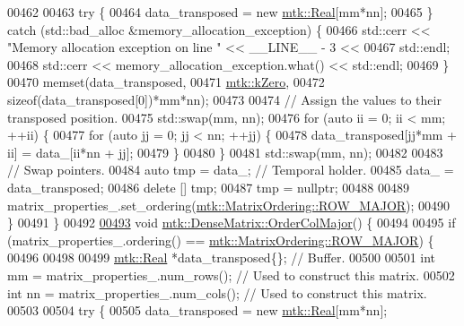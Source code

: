 \begin{DoxyCode}
00462 
00463     \textcolor{keywordflow}{try} \{
00464       data\_transposed = \textcolor{keyword}{new} \hyperlink{group__c01-roots_gac080bbbf5cbb5502c9f00405f894857d}{mtk::Real}[mm*nn];
00465     \} \textcolor{keywordflow}{catch} (std::bad\_alloc &memory\_allocation\_exception) \{
00466       std::cerr << \textcolor{stringliteral}{"Memory allocation exception on line "} << \_\_LINE\_\_ - 3 <<
00467         std::endl;
00468       std::cerr << memory\_allocation\_exception.what() << std::endl;
00469     \}
00470     memset(data\_transposed,
00471           \hyperlink{group__c01-roots_ga59a451a5fae30d59649bcda274fea271}{mtk::kZero},
00472           \textcolor{keyword}{sizeof}(data\_transposed[0])*mm*nn);
00473 
00474     \textcolor{comment}{// Assign the values to their transposed position.}
00475     std::swap(mm, nn);
00476     \textcolor{keywordflow}{for} (\textcolor{keyword}{auto} ii = 0; ii < mm; ++ii) \{
00477       \textcolor{keywordflow}{for} (\textcolor{keyword}{auto} jj = 0; jj < nn; ++jj) \{
00478         data\_transposed[jj*mm + ii] = data\_[ii*nn + jj];
00479       \}
00480     \}
00481     std::swap(mm, nn);
00482 
00483     \textcolor{comment}{// Swap pointers.}
00484     \textcolor{keyword}{auto} tmp = data\_; \textcolor{comment}{// Temporal holder.}
00485     data\_ = data\_transposed;
00486     \textcolor{keyword}{delete} [] tmp;
00487     tmp = \textcolor{keyword}{nullptr};
00488 
00489     matrix\_properties\_.set\_ordering(\hyperlink{namespacemtk_ga622801bd9f912d0f976c3e383f5f581ca21541962976d7709c26e9cd8385bd648}{mtk::MatrixOrdering::ROW\_MAJOR});
00490   \}
00491 \}
00492 
\hypertarget{mtk__dense__matrix_8cc_source_l00493}{}\hyperlink{classmtk_1_1DenseMatrix_a59b9bea24acf39dca64e8549b3527463}{00493} \textcolor{keywordtype}{void} \hyperlink{classmtk_1_1DenseMatrix_a59b9bea24acf39dca64e8549b3527463}{mtk::DenseMatrix::OrderColMajor}() \{
00494 
00495   \textcolor{keywordflow}{if} (matrix\_properties\_.ordering() == \hyperlink{namespacemtk_ga622801bd9f912d0f976c3e383f5f581ca21541962976d7709c26e9cd8385bd648}{mtk::MatrixOrdering::ROW\_MAJOR}) \{
00496 
00498 
00499     \hyperlink{group__c01-roots_gac080bbbf5cbb5502c9f00405f894857d}{mtk::Real} *data\_transposed\{\}; \textcolor{comment}{// Buffer.}
00500 
00501     \textcolor{keywordtype}{int} mm = matrix\_properties\_.num\_rows(); \textcolor{comment}{// Used to construct this matrix.}
00502     \textcolor{keywordtype}{int} nn = matrix\_properties\_.num\_cols(); \textcolor{comment}{// Used to construct this matrix.}
00503 
00504     \textcolor{keywordflow}{try} \{
00505       data\_transposed = \textcolor{keyword}{new} \hyperlink{group__c01-roots_gac080bbbf5cbb5502c9f00405f894857d}{mtk::Real}[mm*nn];

\end{DoxyCode}
